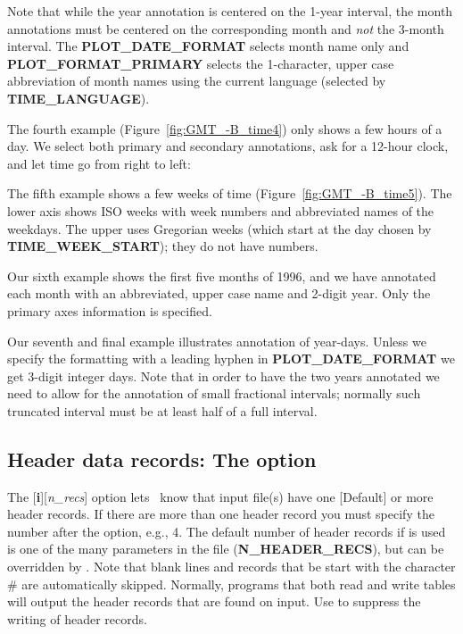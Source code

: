 

Note that while the year annotation is centered on the 1-year interval, the month annotations must be centered
on the corresponding month and \emph{not} the 3-month interval.  The {\bf PLOT\_DATE\_FORMAT} selects month
name only and {\bf PLOT\_FORMAT\_PRIMARY} selects the 1-character, upper case abbreviation of month names using
the current language (selected by {\bf TIME\_LANGUAGE}).

The fourth example (Figure~\ref{fig:GMT_-B_time4}) only shows a few hours of a day.  We select both primary and
secondary annotations, ask for a 12-hour clock, and let time go from right to left:



The fifth example shows a few weeks of time (Figure~\ref{fig:GMT_-B_time5}).  The lower axis shows ISO weeks with
week numbers and abbreviated names of the weekdays.   The upper uses Gregorian weeks (which start at the day chosen
by {\bf TIME\_WEEK\_START}); they do not have numbers.


Our sixth example shows the first five months of 1996, and we have annotated each month with an abbreviated, upper case
name and 2-digit year.  Only the primary axes information is specified.



Our seventh and final example illustrates annotation of year-days.  Unless we specify the formatting with a leading hyphen
in  {\bf PLOT\_DATE\_FORMAT} we get 3-digit integer days.  Note that in order to have the two years
annotated we need to allow for the annotation of small fractional intervals; normally such truncated interval must
be at least half of a full interval.



\subsection{Header data records: The  option}
\label{sec:header}
The [{\bf i}][{\it n\_recs}] option lets \GMT\ know that input file(s) have
one [Default] or more header records.  If there are more than one header
record you must specify the number after the  option, e.g., 4.  The
default number of header records if  is used is one of the many parameters
in the  file ({\bf N\_HEADER\_RECS}), but can be overridden
by .
Note that blank lines and records that be start with the character \# are
automatically skipped.  Normally, programs that both read and write tables will
output the header records that are found on input.  Use  to suppress the
writing of header records.


